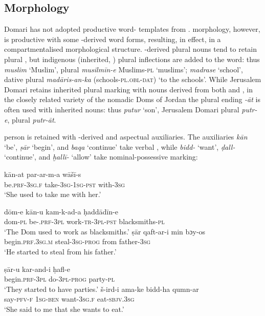 \documentclass[output=paper]{langsci/langscibook}
\begin{document}
\subsection{Morphology}

Domari has not adopted productive word- templates from .   morphology, however, is productive with some -de\-rived word forms, resulting, in effect, in a compartmentalised morphological structure. -derived plural nouns tend to retain  plural , but indigenous (inherited, ) plural inflections are added to the word: thus \textit{muslim} ‘Muslim’, plural \textit{musilmīn-e} Muslims-\textsc{pl} \textsc{‘}muslims’; \textit{madrase} ‘school’, dative plural \textit{madāris-an-ka}  (schools-\textsc{pl.obl-dat}) ‘to the schools’. While Jerusalem Domari retains inherited plural marking with nouns derived from both  and , in the closely related variety of the nomadic Doms of Jordan the  plural ending \textit{-āt} is often used with inherited nouns: thus \textit{putur} ‘son’, Jerusalem Domari plural \textit{putr-e},  plural \textit{putr-āt}.

 person   is retained with -derived  and aspectual auxiliaries. The auxiliaries \textit{kān} ‘be’, \textit{ṣār} ‘begin’, and \textit{baqa} ‘continue’ take  verbal , while \textit{bidd-} ‘want’, \textit{ḍall-} ‘continue’, and \textit{ḫallī-} ‘allow’ take  nominal-possessive marking:

\ea
\ea
\gll kān-at           par-ar-m-a        wāšī-s  \\
     be.\textsc{prf-3sg.f}   take-\textsc{3sg-1sg-pst}  with-\textsc{3sg}\\
\glt ‘She used to take me with her.’

\ex
\gll dōm-e kān-u kam-k-ad-a  {ḥ}addādīn-e\\
     dom-\textsc{pl} be-\textsc{.prf-3pl} work-\textsc{tr-3pl-pst} blacksmiths-\textsc{pl}\\
\glt ‘The Dom used to work as blacksmiths.’
\z
\ex
\ea
\gll ṣār  qaft-ar-i  min  b{ɔ}y-os\\
     begin.\textsc{prf.3sg.m} steal-\textsc{3sg-prog} from father-\textsc{3sg}\\
\glt ‘He started to steal from his father.’

\ex
\gll ṣār-u  kar-and-i  ḥafl-e\\
     begin.\textsc{prf-3pl} do-\textsc{3pl}-\textsc{prog}  party-\textsc{pl}\\
\glt ‘They started to have parties.’
\z
\ex
\ea
\gll š-ird-i  ama-ke bidd-ha qumn-ar\\
     say-\textsc{pfv-f} \textsc{1sg-ben} want-\textsc{3sg.f} eat-\textsc{sbjv.3sg}\\
\glt ‘She said to me that she wants to eat.’
\end{document}
